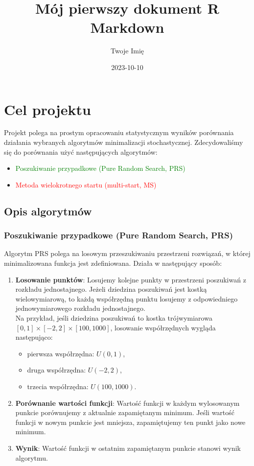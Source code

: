 \documentclass[
]{article}
\title{Mój pierwszy dokument R Markdown}
\author{Twoje Imię}
\date{2023-10-10}
\providecommand{\tightlist}{%
  \setlength{\itemsep}{0pt}\setlength{\parskip}{0pt}}
\begin{document}
\maketitle

\section{Cel projektu}\label{cel-projektu}

Projekt polega na prostym opracowaniu statystycznym wyników porównania
działania wybranych algorytmów minimalizacji stochastycznej.
Zdecydowaliśmy się do porównania użyć następujących algorytmów:

\begin{itemize}
\tightlist
\item
  \textcolor{green}{Poszukiwanie przypadkowe (Pure Random Search, PRS)}
\item
  \textcolor{red}{Metoda wielokrotnego startu (multi-start, MS)}
\end{itemize}

\subsection{Opis algorytmów}\label{opis-algorytmuxf3w}

\subsubsection{Poszukiwanie przypadkowe (Pure Random Search,
PRS)}\label{poszukiwanie-przypadkowe-pure-random-search-prs}

Algorytm PRS polega na losowym przeszukiwaniu przestrzeni rozwiązań, w
której minimalizowana funkcja jest zdefiniowana. Działa w następujący
sposób:

\begin{enumerate}
\def\labelenumi{\arabic{enumi}.}
\item
  \textbf{Losowanie punktów}: Losujemy kolejne punkty w przestrzeni
  poszukiwań z rozkładu jednostajnego. Jeżeli dziedzina poszukiwań jest
  kostką wielowymiarową, to każdą współrzędną punktu losujemy z
  odpowiedniego jednowymiarowego rozkładu jednostajnego.\\
  Na przykład, jeśli dziedzina poszukiwań to kostka trójwymiarowa
  \([0,1] \times [-2,2] \times [100,1000]\), losowanie współrzędnych
  wygląda następująco:

  \begin{itemize}
  \tightlist
  \item
    pierwsza współrzędna: \(U(0,1)\),
  \item
    druga współrzędna: \(U(-2,2)\),
  \item
    trzecia współrzędna: \(U(100,1000)\).
  \end{itemize}
\item
  \textbf{Porównanie wartości funkcji}: Wartość funkcji w każdym
  wylosowanym punkcie porównujemy z aktualnie zapamiętanym minimum.
  Jeśli wartość funkcji w nowym punkcie jest mniejsza, zapamiętujemy ten
  punkt jako nowe minimum.
\item
  \textbf{Wynik}: Wartość funkcji w ostatnim zapamiętanym punkcie
  stanowi wynik algorytmu.
\end{enumerate}
\end{document}
